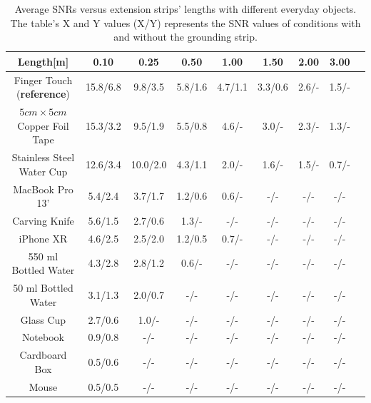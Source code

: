 \begin{table}[ht]
\caption{Average SNRs versus extension strips' lengths with different everyday objects. The table's X and  Y values (X/Y) represents the SNR values of conditions with and without the grounding strip. }
\vspace{-2mm}
	\centering
		\begin{tabular}{|c|c|c|c|c|c|c|c|c|}
		\hline
		\textbf{Length[m]} & \textbf{0.10} & \textbf{0.25} & \textbf{0.50} & \textbf{1.00} & \textbf{1.50} & \textbf{2.00} & \textbf{3.00} \\
		\hline
		Finger Touch (\textbf{reference}) & 15.8/6.8 & 9.8/3.5 & 5.8/1.6 & 4.7/1.1 & 3.3/0.6 & 2.6/- & 1.5/-  \\\hline
		$5 cm\times 5 cm$ Copper Foil Tape & 15.3/3.2 & 9.5/1.9 & 5.5/0.8 & 4.6/- & 3.0/- & 2.3/- & 1.3/-  \\\hline
		Stainless Steel Water Cup &  12.6/3.4 & 10.0/2.0 & 4.3/1.1 & 2.0/- & 1.6/- & 1.5/- & 0.7/-  \\\hline
		MacBook Pro 13' &  5.4/2.4 & 3.7/1.7 & 1.2/0.6 & 0.6/- & -/- & -/- & -/- \\\hline
		Carving Knife  & 5.6/1.5 & 2.7/0.6 & 1.3/- & -/- & -/- & -/- & -/-  \\\hline
		iPhone XR  & 4.6/2.5 & 2.5/2.0 & 1.2/0.5 & 0.7/- & -/- & -/- & -/- \\\hline
		550 ml Bottled Water  &  4.3/2.8 & 2.8/1.2 & 0.6/- & -/- & -/- & -/- & -/- \\\hline
		50 ml Bottled Water  &  3.1/1.3 & 2.0/0.7 &  -/- & -/- & -/- & -/- & -/- \\\hline
		Glass Cup &  2.7/0.6 & 1.0/- & -/- & -/- & -/- & -/- & -/-  \\\hline
		Notebook & 0.9/0.8 & -/- & -/- & -/- & -/- & -/- & -/-   \\\hline
		Cardboard Box  & 0.5/0.6 & -/- & -/- & -/- & -/- & -/- & -/-  \\\hline
		Mouse & 0.5/0.5 & -/- & -/- & -/- & -/- & -/- & -/- \\\hline
		\end{tabular}
		
		\label{tab:snrtableforobj}
		
\end{table}



